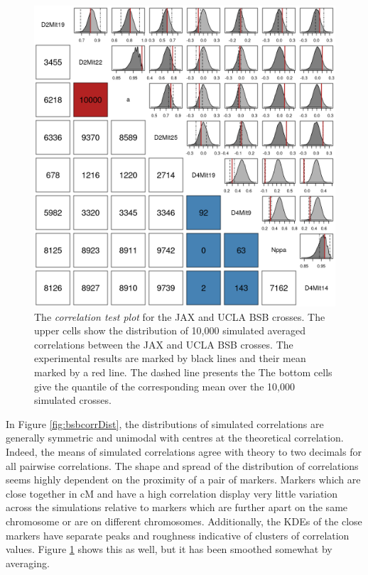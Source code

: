 \documentclass[sts]{imsart}
\begin{document}
\begin{figure}[htp]
  \begin{center}
      \includegraphics[scale = 0.5]{../img/bsbCorrTest.png}
  \end{center}
  \caption{The \emph{correlation test plot} for the JAX and UCLA BSB crosses. The upper cells show the distribution of 10,000 simulated averaged correlations between the JAX and UCLA BSB crosses. The experimental results are marked by black lines and their mean marked by a red line. The dashed line presents the  The bottom cells give the quantile of the corresponding mean over the 10,000 simulated crosses.}
  \label{fig:bsbcorrTest}
\end{figure}

In Figure \ref{fig:bsbcorrDist}, the distributions of simulated correlations are generally symmetric and unimodal with centres at the theoretical correlation. Indeed, the means of simulated correlations agree with theory to two decimals for all pairwise correlations. The shape and spread of the distribution of correlations seems highly dependent on the proximity of a pair of markers. Markers which are close together in cM and have a high correlation display very little variation across the simulations relative to markers which are further apart on the same chromosome or are on different chromosomes. Additionally, the KDEs of the close markers have separate peaks and roughness indicative of clusters of correlation values. Figure \ref{fig:bsbcorrTest} shows this as well, but it has been smoothed somewhat by averaging.
\end{document}
